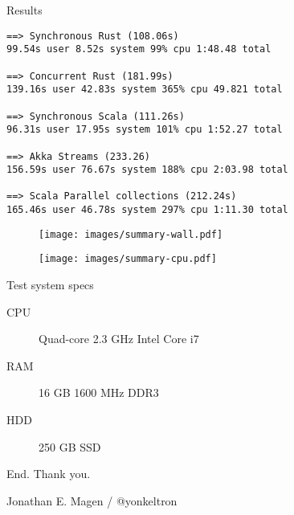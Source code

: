 \documentclass[aspectratio=169,14pt]{beamer}
\newcommand{\megatext}[1]{
  \begin{center}
    \Huge
    #1
  \end{center}
}
\begin{document}
\begin{frame}[fragile]{Results}
  \small
  \begin{verbatim}
==> Synchronous Rust (108.06s)
99.54s user 8.52s system 99% cpu 1:48.48 total

==> Concurrent Rust (181.99s)
139.16s user 42.83s system 365% cpu 49.821 total

==> Synchronous Scala (111.26s)
96.31s user 17.95s system 101% cpu 1:52.27 total

==> Akka Streams (233.26)
156.59s user 76.67s system 188% cpu 2:03.98 total

==> Scala Parallel collections (212.24s)
165.46s user 46.78s system 297% cpu 1:11.30 total
  \end{verbatim}
\end{frame}

\begin{frame}
  \begin{figure}
    \texttt{[image: images/summary-wall.pdf]}
  \end{figure}
\end{frame}

\begin{frame}
  \begin{figure}
    \texttt{[image: images/summary-cpu.pdf]}
  \end{figure}
\end{frame}


\begin{frame}{Test system specs}
  \begin{description}
  \item[CPU] Quad-core 2.3 GHz Intel Core i7
  \item[RAM] 16 GB 1600 MHz DDR3
  \item[HDD] 250 GB SSD
  \end{description}
\end{frame}


\begin{frame}
  \megatext{End. Thank you.}
  \Large
  \centering
  Jonathan E. Magen /  @yonkeltron
\end{frame}
\end{document}
